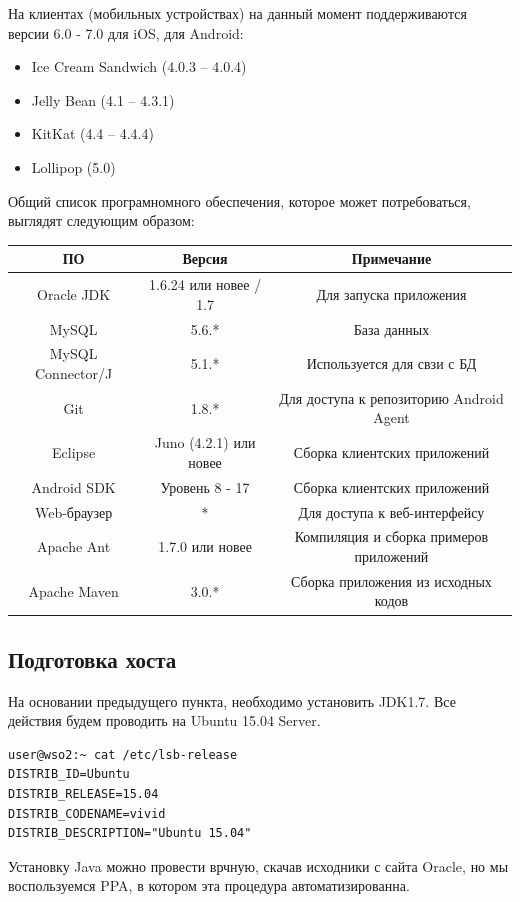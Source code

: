 \documentclass[a4paper, 12pt]{article}		%
\begin{document}
На клиентах (мобильных устройствах) на данный момент поддерживаются версии 6.0 - 7.0 для iOS, для Android:
\begin{itemize}
\item Ice Cream Sandwich (4.0.3 – 4.0.4)
\item Jelly Bean (4.1 – 4.3.1)
\item KitKat (4.4 – 4.4.4)
\item Lollipop (5.0)
\end{itemize}

Общий список програмномного обеспечения, которое может потребоваться, выглядят следующим образом:

\begin{tabular}{|c|c|c|}
\hline 
ПО & Версия & Примечание \\ 
\hline 
{Oracle JDK} & 1.6.24 или новее / 1.7 & Для запуска приложения \\ 
\hline 
MySQL & 5.6.* & База данных \\ 
\hline 
MySQL Connector/J & 5.1.* & Используется для свзи с БД \\ 
\hline 
Git & 1.8.* & Для доступа к репозиторию Android Agent \\ 
\hline 
Eclipse & Juno (4.2.1) или новее & Сборка клиентских приложений \\ 
\hline 
Android SDK & Уровень 8 - 17 & Сборка клиентских приложений \\ 
\hline 
Web-браузер & * & Для доступа к веб-интерфейсу \\ 
\hline 
Apache Ant & 1.7.0 или новее & Компиляция и сборка примеров приложений \\ 
\hline 
Apache Maven & 3.0.* & Сборка приложения из исходных кодов \\ 
\hline 
\end{tabular} 

\subsection{Подготовка хоста}

На основании предыдущего пункта, необходимо установить JDK1.7. Все действия будем проводить на Ubuntu 15.04 Server.

\begin{Verbatim}[frame=single]
user@wso2:~ cat /etc/lsb-release 
DISTRIB_ID=Ubuntu
DISTRIB_RELEASE=15.04
DISTRIB_CODENAME=vivid
DISTRIB_DESCRIPTION="Ubuntu 15.04"
\end{Verbatim}

Установку Java можно провести врчную, скачав исходники с сайта Oracle, но мы воспользуемся PPA, в котором эта процедура автоматизированна.
\end{document}

